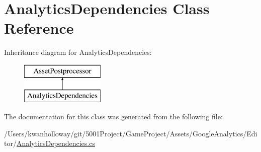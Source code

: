 \hypertarget{class_analytics_dependencies}{}\section{Analytics\+Dependencies Class Reference}
\label{class_analytics_dependencies}
Inheritance diagram for Analytics\+Dependencies\+:\begin{figure}[H]
\begin{center}
\leavevmode
\includegraphics[height=2.000000cm]{class_analytics_dependencies}
\end{center}
\end{figure}


The documentation for this class was generated from the following file\+:\begin{DoxyCompactItemize}
\item 
/\+Users/kwanholloway/git/5001\+Project/\+Game\+Project/\+Assets/\+Google\+Analytics/\+Editor/\hyperlink{_analytics_dependencies_8cs}{Analytics\+Dependencies.\+cs}\end{DoxyCompactItemize}
